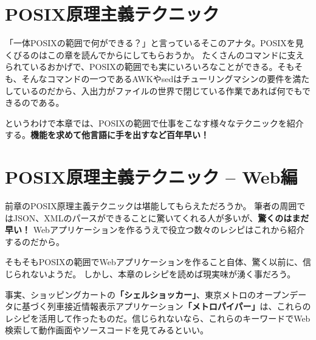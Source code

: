\documentclass[b5paper,9pt,fleqn,tombow,openany]{jsbook}
\begin{document}
\chapter{POSIX原理主義テクニック}

「一体POSIXの範囲で何ができる？」と言っているそこのアナタ。POSIXを見くびるのはこの章を読んでからにしてもらおうか。
たくさんのコマンドに支えられているおかげで、POSIXの範囲でも実にいろいろなことができる。そもそも、そんなコマンドの一つであるAWKやsedはチューリングマシンの要件を満たしているのだから、入出力がファイルの世界で閉じている作業であれば何でもできるのである。

というわけで本章では、POSIXの範囲で仕事をこなす様々なテクニックを紹介する。\textbf{機能を求めて他言語に手を出すなど百年早い！}



\chapter{POSIX原理主義テクニック -- Web編}

前章のPOSIX原理主義テクニックは堪能してもらえただろうか。
筆者の周囲ではJSON、XMLのパースができることに驚いてくれる人が多いが、\textbf{驚くのはまだ早い！}
Webアプリケーションを作るうえで役立つ数々のレシピはこれから紹介するのだから。

そもそもPOSIXの範囲でWebアプリケーションを作ること自体、驚く以前に、信じられないようだ。
しかし、本章のレシピを読めば現実味が湧く事だろう。

事実、ショッピングカートの\textbf{「シェルショッカー」}、東京メトロのオープンデータに基づく列車接近情報表示アプリケーション\textbf{「メトロパイパー」}は、これらのレシピを活用して作ったものだ。信じられないなら、これらのキーワードでWeb検索して動作画面やソースコードを見てみるといい。
\end{document}
